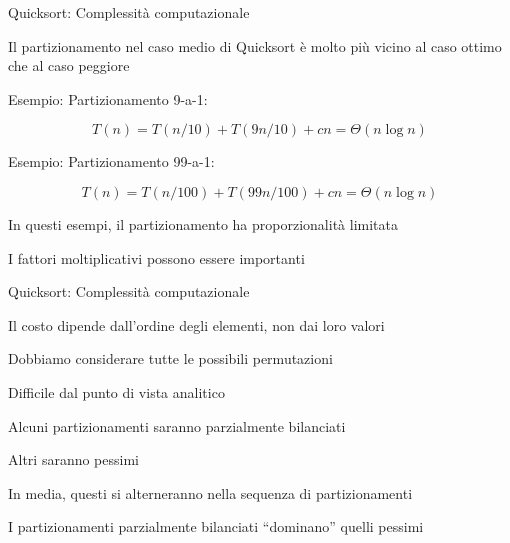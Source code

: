 \begin{frame}{Quicksort: Complessità computazionale}

\vspace{-9pt}
\BIL
\item Il partizionamento nel caso medio di Quicksort è molto più vicino al caso ottimo che al caso peggiore
\item Esempio: Partizionamento 9-a-1:	

\vspace{-6pt}
\[T(n) = T(n/10)+T(9n/10)+cn = \Theta(n \log n)\]
\item Esempio: Partizionamento 99-a-1:	

\vspace{-6pt}
\[T(n) = T(n/100)+T(99n/100)+cn  = \Theta(n \log n)\]
\EIL
{}
\BIL
\item In questi esempi, il partizionamento ha proporzionalità limitata
\item I fattori moltiplicativi possono essere importanti
\EIL
\end{frame}


\begin{frame}{Quicksort: Complessità computazionale}

\vspace{-9pt}
\BIL
\item Il costo dipende dall'ordine degli elementi, non dai loro valori
\item Dobbiamo considerare tutte le possibili permutazioni
\item Difficile dal punto di vista analitico
\EIL

\BIL
\item Alcuni partizionamenti saranno parzialmente bilanciati
\item Altri saranno pessimi
\item In media, questi si alterneranno nella sequenza di partizionamenti
\item I partizionamenti parzialmente bilanciati “dominano” quelli pessimi
\EIL
\end{frame}

